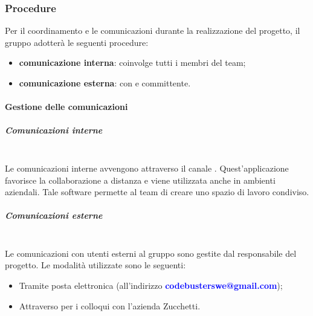 \subsubsection{Procedure}
Per il coordinamento e le comunicazioni durante la realizzazione del progetto, il gruppo adotterà le seguenti procedure: 
\begin{itemize}
\item\textbf{comunicazione interna}: coinvolge tutti i membri del team;
\item\textbf{comunicazione esterna}: con  e committente.
\end{itemize}

\paragraph{Gestione delle comunicazioni}

\subparagraph{Comunicazioni interne} \mbox{} \\
Le comunicazioni interne avvengono attraverso il canale . Quest'applicazione favorisce la collaborazione a distanza e viene utilizzata anche in ambienti aziendali. Tale software permette al team di creare uno spazio di lavoro condiviso.
\subparagraph{Comunicazioni esterne} \mbox{} \\
Le comunicazioni con utenti esterni al gruppo sono gestite dal responsabile del progetto. Le modalità utilizzate sono le seguenti: 
\begin{itemize}
\item Tramite posta elettronica (all'indirizzo \textcolor{blue}{\textbf{codebusterswe@gmail.com}}); 
\item Attraverso  per i colloqui con l'azienda Zucchetti.
\end{itemize} 
